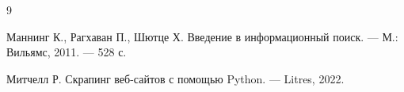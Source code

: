 \begin{thebibliography}{9}

Маннинг К., Рагхаван П., Шютце Х. Введение в информационный поиск. --- М.: Вильямс, 2011. --- 528 с.

Митчелл Р. Скрапинг веб-сайтов с помощью Python. –-- Litres, 2022.

\end{thebibliography}
